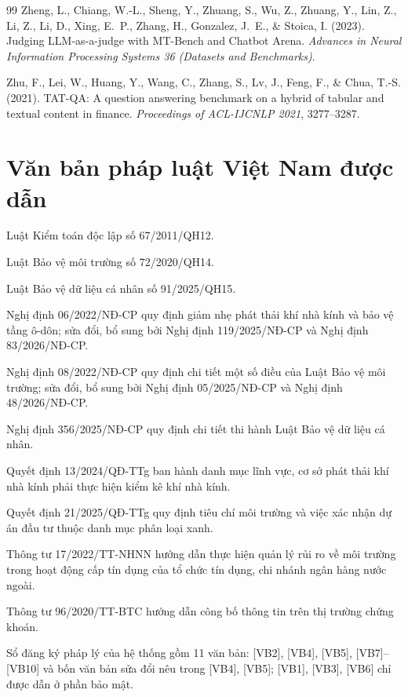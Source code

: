 \begin{thebibliography}{99}
 Zheng, L., Chiang, W.-L., Sheng, Y., Zhuang, S., Wu, Z., Zhuang, Y., Lin, Z., Li, Z., Li, D., Xing, E.~P., Zhang, H., Gonzalez, J.~E., \& Stoica, I. (2023). Judging LLM-as-a-judge with MT-Bench and Chatbot Arena. \emph{Advances in Neural Information Processing Systems 36 (Datasets and Benchmarks)}.

 Zhu, F., Lei, W., Huang, Y., Wang, C., Zhang, S., Lv, J., Feng, F., \& Chua, T.-S. (2021). TAT-QA: A question answering benchmark on a hybrid of tabular and textual content in finance. \emph{Proceedings of ACL-IJCNLP 2021}, 3277–3287.

\end{thebibliography}

\section*{Văn bản pháp luật Việt Nam được dẫn}

{\small
\begin{enumerate}[label={[VB\arabic*]},leftmargin=3.2em,itemsep=1pt]
\item Luật Kiểm toán độc lập số 67/2011/QH12.
\item Luật Bảo vệ môi trường số 72/2020/QH14.
\item Luật Bảo vệ dữ liệu cá nhân số 91/2025/QH15.
\item Nghị định 06/2022/NĐ-CP quy định giảm nhẹ phát thải khí nhà kính và bảo vệ tầng ô-dôn; sửa đổi, bổ sung bởi Nghị định 119/2025/NĐ-CP và Nghị định 83/2026/NĐ-CP.
\item Nghị định 08/2022/NĐ-CP quy định chi tiết một số điều của Luật Bảo vệ môi trường; sửa đổi, bổ sung bởi Nghị định 05/2025/NĐ-CP và Nghị định 48/2026/NĐ-CP.
\item Nghị định 356/2025/NĐ-CP quy định chi tiết thi hành Luật Bảo vệ dữ liệu cá nhân.
\item Quyết định 13/2024/QĐ-TTg ban hành danh mục lĩnh vực, cơ sở phát thải khí nhà kính phải thực hiện kiểm kê khí nhà kính.
\item Quyết định 21/2025/QĐ-TTg quy định tiêu chí môi trường và việc xác nhận dự án đầu tư thuộc danh mục phân loại xanh.
\item Thông tư 17/2022/TT-NHNN hướng dẫn thực hiện quản lý rủi ro về môi trường trong hoạt động cấp tín dụng của tổ chức tín dụng, chi nhánh ngân hàng nước ngoài.
\item Thông tư 96/2020/TT-BTC hướng dẫn công bố thông tin trên thị trường chứng khoán.
\end{enumerate}
Sổ đăng ký pháp lý của hệ thống gồm 11 văn bản: [VB2], [VB4], [VB5], [VB7]–[VB10] và bốn văn bản sửa đổi nêu trong [VB4], [VB5]; [VB1], [VB3], [VB6] chỉ được dẫn ở phần bảo mật.
}
